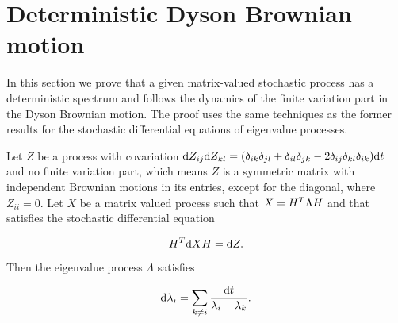 \section{Deterministic Dyson Brownian motion}

In this section we prove that a given matrix-valued stochastic process has a deterministic spectrum and follows the dynamics of the finite variation part in the Dyson Brownian motion. The proof uses the same techniques as the former results for the stochastic differential equations of eigenvalue processes. 

\begin{theorem}

Let $Z$ be a process with covariation $\mathrm d Z_{ij}\mathrm d Z_{kl} = (\delta_{ik}\delta_{jl} + \delta_{il}\delta_{jk} - 2\delta_{ij}\delta_{kl}\delta_{ik} )\mathrm d t$ and no finite variation part, which means $Z$ is a symmetric matrix with independent Brownian motions in its entries, except for the diagonal, where $Z_{ii} = 0$. Let $X$ be a matrix valued process such that  $X = H^T \Lambda H$ and that satisfies the stochastic differential equation


\begin{equation*}
     H^T \mathrm d X H = \mathrm d Z.
\end{equation*}

Then the eigenvalue process $\Lambda$ satisfies

\begin{equation} \label{eq:deterministic_dyson}
    \mathrm d \lambda_i = \sum_{k\neq i} \frac{\mathrm d t}{\lambda_i - \lambda_k}.
\end{equation}

\end{theorem}

